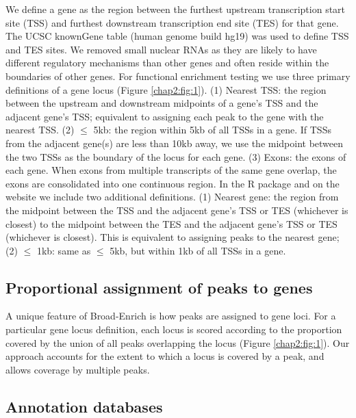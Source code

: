 We define a gene as the region between the furthest upstream transcription start site (TSS) and furthest downstream transcription end site (TES) for that gene. The UCSC knownGene table (human genome build hg19) was used to define TSS and TES sites. We removed small nuclear RNAs as they are likely to have different regulatory mechanisms than other genes and often reside within the boundaries of other genes. For functional enrichment testing we use three primary definitions of a gene locus (Figure \ref{chap2:fig:1}). (1) Nearest TSS: the region between the upstream and downstream midpoints of a gene's TSS and the adjacent gene's TSS; equivalent to assigning each peak to the gene with the nearest TSS.  (2) $\leq$ 5kb: the region within 5kb of all TSSs in a gene. If TSSs from the adjacent gene(s) are less than 10kb away, we use the midpoint between the two TSSs as the boundary of the locus for each gene. (3) Exons: the exons of each gene. When exons from multiple transcripts of the same gene overlap, the exons are consolidated into one continuous region. In the R package and on the website we include two additional definitions. (1) Nearest gene: the region from the midpoint between the TSS and the adjacent gene's TSS or TES (whichever is closest) to the midpoint between the TES and the adjacent gene's TSS or TES (whichever is closest). This is equivalent to assigning peaks to the nearest gene; (2) $\leq$ 1kb: same as $\leq$ 5kb, but within 1kb of all TSSs in a gene.

\subsection{Proportional assignment of peaks to genes}
\label{broadenrich_methods_assignment}

A unique feature of Broad-Enrich is how peaks are assigned to gene loci. For a particular gene locus definition, each locus is scored according to the proportion covered by the union of all peaks overlapping the locus (Figure \ref{chap2:fig:1}). Our approach accounts for the extent to which a locus is covered by a peak, and allows coverage by multiple peaks.

\subsection{Annotation databases}
\label{broadenrich_methods_databases}

